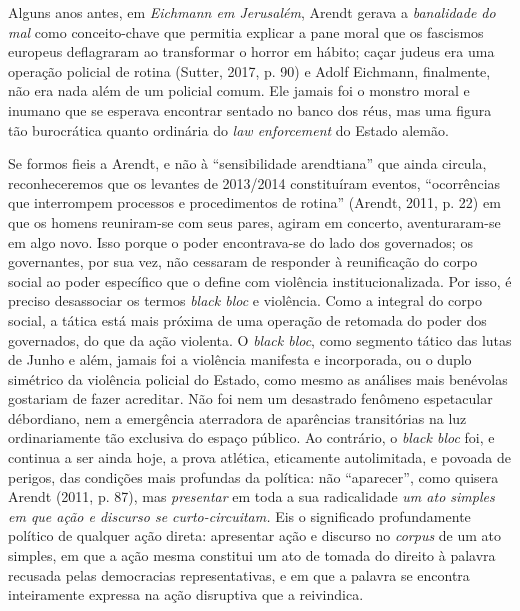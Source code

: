 Alguns anos antes, em \emph{Eichmann em Jerusalém}, Arendt gerava a
\emph{banalidade do mal} como conceito-chave que permitia explicar a
pane moral que os fascismos europeus deflagraram ao transformar o horror
em hábito; caçar judeus era uma operação policial de rotina (Sutter,
2017, p. 90) e Adolf Eichmann, finalmente, não era nada além de um
policial comum. Ele jamais foi o monstro moral e inumano que se esperava
encontrar sentado no banco dos réus, mas uma figura tão burocrática
quanto ordinária do \emph{law enforcement} do Estado alemão.

Se formos fieis a Arendt, e não à ``sensibilidade arendtiana'' que ainda
circula, reconheceremos que os levantes de 2013/2014 constituíram
eventos, ``ocorrências que interrompem processos e procedimentos de
rotina'' (Arendt, 2011, p. 22) em que os homens reuniram-se com seus
pares, agiram em concerto, aventuraram-se em algo novo. Isso porque o
poder encontrava-se do lado dos governados; os governantes, por sua vez,
não cessaram de responder à reunificação do corpo social ao poder
específico que o define com violência institucionalizada. Por isso, é
preciso desassociar os termos \emph{black bloc} e violência. Como a
integral do corpo social, a tática está mais próxima de uma operação de
retomada do poder dos governados, do que da ação violenta. O \emph{black
bloc}, como segmento tático das lutas de Junho e além, jamais foi a
violência manifesta e incorporada, ou o duplo simétrico da violência
policial do Estado, como mesmo as análises mais benévolas gostariam de
fazer acreditar. Não foi nem um desastrado fenômeno espetacular
débordiano, nem a emergência aterradora de aparências transitórias na
luz ordinariamente tão exclusiva do espaço público. Ao contrário, o
\emph{black bloc} foi, e continua a ser ainda hoje, a prova atlética,
eticamente autolimitada, e povoada de perigos, das condições mais
profundas da política: não ``aparecer'', como quisera Arendt (2011, p.
87), mas \emph{presentar} em toda a sua radicalidade \emph{um ato
simples em que ação e discurso se curto-circuitam.} Eis o significado
profundamente político de qualquer ação direta: apresentar ação e
discurso no \emph{corpus} de um ato simples, em que a ação mesma
constitui um ato de tomada do direito à palavra recusada pelas
democracias representativas, e em que a palavra se encontra inteiramente
expressa na ação disruptiva que a reivindica.

